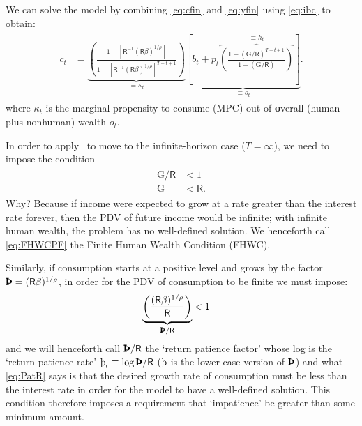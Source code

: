 \documentclass{scrartcl}
\begin{document}
\hypertarget{cFuncAnalytical}{}
We can solve the model by combining \eqref{eq:cfin} and \eqref{eq:yfin} using 
\eqref{eq:ibc} to obtain:
\begin{equation}\begin{gathered}\begin{aligned}
        \boldsymbol{\mathit{c}}_{t} & =  \underbrace{\left(\frac{1-[\mathsf{R}^{-1}(\mathsf{R}\beta)^{1/\rho}]}{1-[\mathsf{R}^{-1}(\mathsf{R}\beta)^{1/\rho}]^{T-t+1}}\right)}_{\equiv \kappa_{t}} \underbrace{\left[\boldsymbol{\mathit{b}}_{t}+\boldsymbol{\mathit{p}}_{t}\overbrace{\left(\frac{1-({\ensuremath{\mathrm{G}}}/\mathsf{R})^{T-t+1}}{1-({\ensuremath{\mathrm{G}}}/\mathsf{R})}\right)}^{\equiv h_{t}}\right]}_{\equiv \boldsymbol{\mathit{o}}_{t}} \label{eq:cfinhoriz}.
\end{aligned}\end{gathered}\end{equation}
where $\kappa_{t}$ is the marginal propensity to consume (MPC) out of \textbf{o}verall (human plus nonhuman) wealth $\boldsymbol{\mathit{o}}_{t}$.

In order to apply \InfSum~to move to the infinite-horizon case ($T=\infty$), we need to impose the condition
\begin{equation}\begin{gathered}\begin{aligned}
        {\ensuremath{\mathrm{G}}}/\mathsf{R} & <  1
\\  {\ensuremath{\mathrm{G}}}   & <  \mathsf{R}.  \label{eq:FHWCPF}
\end{aligned}\end{gathered}\end{equation}
Why?
Because if income were expected to grow at a rate
greater than the interest rate forever, then the PDV of future income
would be infinite; with infinite human wealth, the problem has no
well-defined solution.
We henceforth call \eqref{eq:FHWCPF} the
Finite Human Wealth Condition (FHWC).

Similarly, if consumption starts at a positive level and grows by the factor $\text{\pmb{\Thorn}}=(\mathsf{R} \beta)^{1/\rho}$, in order for the PDV of consumption to be finite we must impose:
\begin{equation}\begin{gathered}\begin{aligned}
        \underbrace{\left(\frac{(\mathsf{R}\beta)^{1/\rho}}{\mathsf{R}}\right)}_{\text{\pmb{\Thorn}}/{\mathsf{R}}} & < 1  \label{eq:PatR}
\end{aligned}\end{gathered}\end{equation}
and we will henceforth call $\text{\pmb{\Thorn}}/{\mathsf{R}}$ the `return patience factor'
whose log is the `return patience rate' $\text{\thorn}_{\mathsf{r}} \equiv \log \text{\pmb{\Thorn}}/{\mathsf{R}}$ ($\text{\thorn}$ is the lower-case version of $\text{\pmb{\Thorn}}$) and
what \eqref{eq:PatR} says is that the desired growth rate of
consumption must be less than the interest rate in order for the model
to have a well-defined solution.
This condition therefore
imposes a requirement that `impatience' be greater than some minimum amount.
\end{document}
